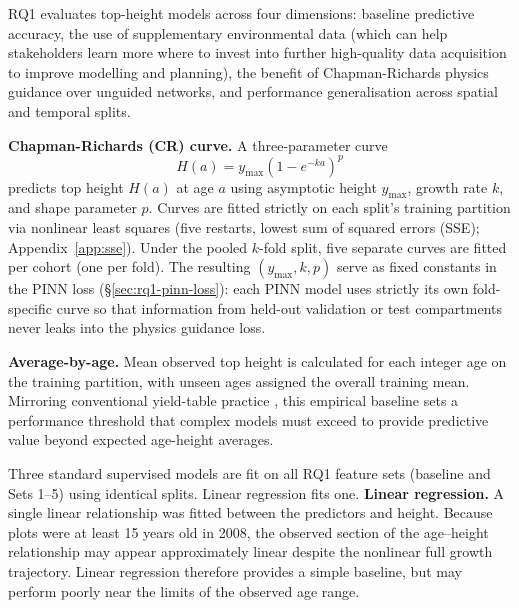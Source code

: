 RQ1 evaluates top-height models across four dimensions: baseline predictive accuracy, the use of supplementary environmental data (which can help stakeholders learn more where to invest into further high-quality data acquisition to improve modelling and planning), the benefit of Chapman-Richards physics guidance over unguided networks, and performance generalisation across spatial and temporal splits.

\textbf{Chapman-Richards (CR) curve.} A three-parameter curve
\begin{equation}
H(a) = y_{\max}\left(1-e^{-ka}\right)^{p}
\label{eq:cr}
\end{equation}
predicts top height $H(a)$ at age $a$ using asymptotic height $y_{\max}$, growth rate $k$, and shape parameter $p$. Curves are fitted strictly on each split's training partition via nonlinear least squares (five restarts, lowest sum of squared errors (SSE); Appendix~\ref{app:sse}). Under the pooled $k$-fold split, five separate curves are fitted per cohort (one per fold). The resulting $(y_{\max}, k, p)$ serve as fixed constants in the PINN loss (\S\ref{sec:rq1-pinn-loss}): each PINN model uses strictly its own fold-specific curve so that information from held-out validation or test compartments never leaks into the physics guidance loss.

\textbf{Average-by-age.} Mean observed top height is calculated for each integer age on the training partition, with unseen ages assigned the overall training mean. Mirroring conventional yield-table practice \citep{forestResearchForestYield}, this empirical baseline sets a performance threshold that complex models must exceed to provide predictive value beyond expected age-height averages.

Three standard supervised models are fit on all RQ1 feature sets (baseline and Sets 1–5) using identical splits. Linear regression fits one. 
\textbf{Linear regression.} A single linear relationship was fitted between the predictors and height. Because plots were at least 15 years old in 2008, the observed section of the age--height relationship may appear approximately linear despite the nonlinear full growth trajectory. Linear regression therefore provides a simple baseline, but may perform poorly near the limits of the observed age range. 


